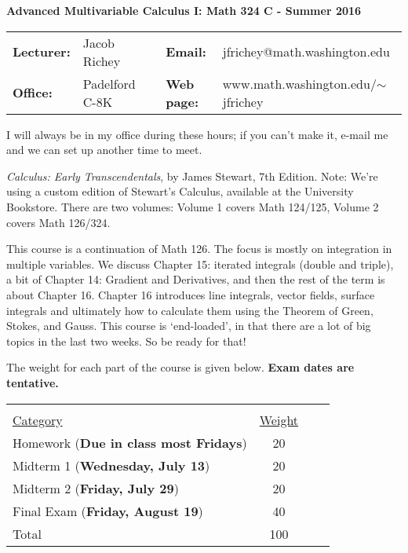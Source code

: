 \documentclass[11 pt]{report}
\begin{document}
\centerline{\bf Advanced Multivariable Calculus I: Math 324 C - Summer 2016}
\vspace{0.2cm}
\begin{tabular}{lllll}
{\bf Lecturer: }    & Jacob Richey &  & {\bf Email: }       & jfrichey@math.washington.edu \\
{\bf Office: }      & Padelford C-8K        &  & {\bf Web page: }    & www.math.washington.edu/$\sim$jfrichey \\
\end{tabular}
\vspace{0.25cm}

I will always be in my office during these hours; if you can't make it, e-mail me and we can set up another time to meet.  \vspace{0.25cm}

 \emph{Calculus: Early Transcendentals}, by James Stewart, 7th
Edition. Note: We're using a custom edition of Stewart's Calculus,
available at the University Bookstore.  There are two volumes:
Volume 1 covers Math 124/125, Volume 2 covers Math 126/324. 

\vspace{0.25cm}

  This course is a continuation of
Math 126.  The focus is mostly on integration in multiple variables.
We discuss Chapter 15: iterated integrals (double and triple), a bit
of Chapter 14: Gradient and Derivatives, and then the rest of the
term is about Chapter 16.  Chapter 16 introduces line integrals,
vector fields, surface integrals and ultimately how to calculate
them using the Theorem of Green, Stokes, and Gauss.  This course is
`end-loaded', in that there are a lot of big topics in the last two
weeks.  So be ready for that!

\vspace{0.25cm}

 The weight for each part of the course is given
below. \textbf{Exam dates are tentative.}

\vspace{-.25in}

\begin{center}\begin{tabular}{lccl} &  \\
\underline{Category} & \underline{Weight}  \\
Homework   ({\bf Due in class most Fridays})                 & 20  \\
Midterm 1  ({\bf Wednesday, July 13})                   & 20  \\
Midterm 2  ({\bf Friday, July 29})                   & 20   \\
Final Exam ({\bf Friday, August 19})                        & 40   \\
\hline Total                                        & 100
\end{tabular}
\end{center}
\end{document}
